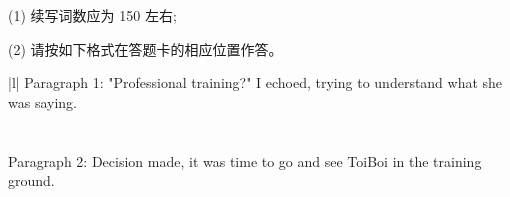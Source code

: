 \documentclass{英语试卷}
\begin{document}
\par (1) 续写词数应为 150 左右;\par
\par (2) 请按如下格式在答题卡的相应位置作答。\par
\par\vspace{0.4em}
\begin{center}\begin{tabular}{{|l|}}
\hline
Paragraph 1: "Professional training?" I echoed, trying to understand what she was saying. \\
 \\
 \\
Paragraph 2: Decision made, it was time to go and see ToiBoi in the training ground. \\
 \\
 \\
 \\
\hline
\end{tabular}\end{center}
\vspace{0.4em}
\end{document}
